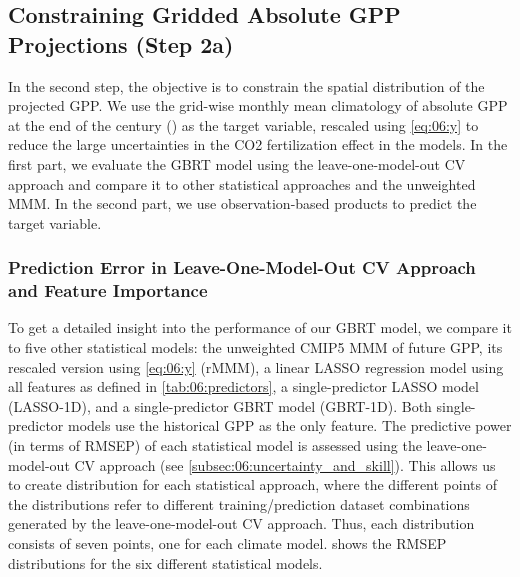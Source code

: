\subsection{Constraining Gridded Absolute \acs{GPP} Projections (Step 2a)}
\label{subsec:06:results_step2a}

In the second step, the objective is to constrain the spatial distribution of
the projected \ac{GPP}. We use the grid-wise monthly mean climatology of
absolute \ac{GPP} at the end of the  century () as
the target variable, rescaled using \cref{eq:06:y} to reduce the large
uncertainties in the \acs{CO2} fertilization effect in the models. In the first
part, we evaluate the GBRT model using the leave-one-model-out \ac{CV} approach
and compare it to other statistical approaches and the unweighted \ac{MMM}. In
the second part, we use observation-based products to predict the target
variable.


\subsubsection{Prediction Error in Leave-One-Model-Out \acs{CV} Approach and
  Feature Importance}
\label{subsubsec:06:results_step2a_ml_inference}

To get a detailed insight into the performance of our \ac{GBRT} model, we
compare it to five other statistical models: the unweighted \acs{CMIP}5
\ac{MMM} of future \ac{GPP}, its rescaled version using \cref{eq:06:y}
(r\acs{MMM}), a linear \ac{LASSO} regression model using all features as
defined in \cref{tab:06:predictors}, a single-predictor \ac{LASSO} model
(\acs{LASSO}-1D), and a single-predictor \ac{GBRT} model (\acs{GBRT}-1D). Both
single-predictor models use the historical \ac{GPP} as the only feature. The
predictive power (in terms of \ac{RMSEP}) of each statistical model is assessed
using the leave-one-model-out \ac{CV} approach (see
\cref{subsec:06:uncertainty_and_skill}). This allows us to create 
distribution for each statistical approach, where the different points of the
distributions refer to different training/prediction dataset combinations
generated by the leave-one-model-out \ac{CV} approach. Thus, each distribution
consists of seven points, one for each climate model.
 shows the \ac{RMSEP} distributions for the
six different statistical models.


